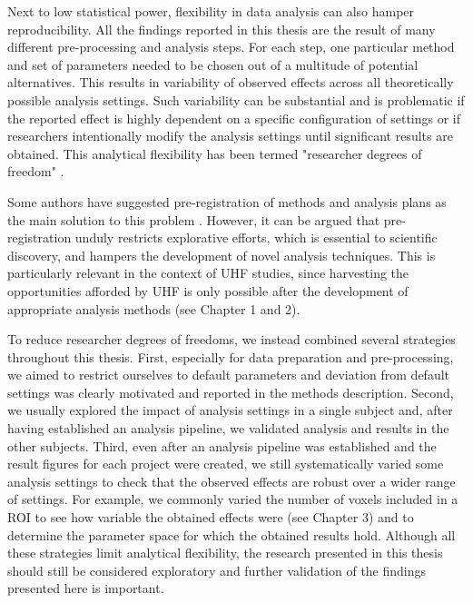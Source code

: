 Next to low statistical power, flexibility in data analysis can also hamper reproducibility. All the findings reported in this thesis are the result of many different pre-processing and analysis steps. For each step, one particular method and set of parameters needed to be chosen out of a multitude of potential alternatives. This results in variability of observed effects across all theoretically possible analysis settings. Such variability can be substantial \parencite{Carp2012} and is problematic if the reported effect is highly dependent on a specific configuration of settings or if researchers intentionally modify the analysis settings until significant results are obtained. This analytical flexibility has been termed "researcher degrees of freedom" \parencite{Simmons2011}.

Some authors have suggested pre-registration of methods and analysis plans as the main solution to this problem \parencite{Poldrack2017a}. However, it can be argued that pre-registration unduly restricts explorative efforts, which is essential to scientific discovery, and hampers the development of novel analysis techniques. This is particularly relevant in the context of UHF studies, since harvesting the opportunities afforded by UHF is only possible after the development of appropriate analysis methods (see Chapter 1 and 2).

To reduce researcher degrees of freedoms, we instead combined several strategies throughout this thesis. First, especially for data preparation and pre-processing, we aimed to restrict ourselves to default parameters and deviation from default settings was clearly motivated and reported in the methods description. Second, we usually explored the impact of analysis settings in a single subject and, after having established an analysis pipeline, we validated analysis and results in the other subjects. Third, even after an analysis pipeline was established and the result figures for each project were created, we still systematically varied some analysis settings to check that the observed effects are robust over a wider range of settings. For example, we commonly varied the number of voxels included in a ROI to see how variable the obtained effects were (see Chapter 3) and to determine the parameter space for which the obtained results hold. Although all these strategies limit analytical flexibility, the research presented in this thesis should still be considered exploratory and further validation of the findings presented here is important.

